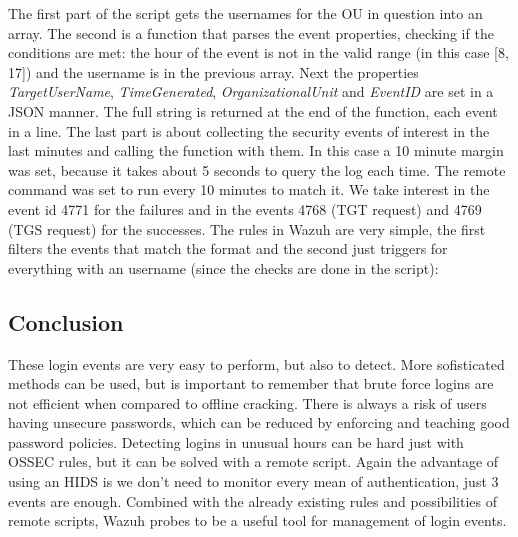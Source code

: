 \linej

\linej
The first part of the script gets the usernames for the OU in question into an array.
\linej
The second is a function that parses the event properties, checking if the conditions are met: the hour of the event is not in the valid range (in this case [8, 17]) and the username is in the previous array.
Next the properties \textit{TargetUserName}, \textit{TimeGenerated}, \textit{OrganizationalUnit} and \textit{EventID} are set in a JSON manner.
The full string is returned at the end of the function, each event in a line.
\linej
The last part is about collecting the security events of interest in the last minutes and calling the function with them. In this case a 10 minute margin was set, because it takes about 5 seconds to query the log each time. The remote command was set to run every 10 minutes to match it.
\linej
We take interest in the event id 4771 for the failures and in the events 4768 (TGT request) and 4769 (TGS request) for the successes\cite{windows_events}.
\linej
\linej
The rules in Wazuh are very simple, the first filters the events that match the format and the second just triggers for everything with an username (since the checks are done in the script):


\subsection{Conclusion}
These login events are very easy to perform, but also to detect.
More sofisticated methods can be used, but is important to remember that brute force logins are not efficient when compared to offline cracking.
There is always a risk of users having unsecure passwords, which can be reduced by enforcing and teaching good password policies.
\linej
Detecting logins in unusual hours can be hard just with OSSEC rules, but it can be solved with a remote script.
\linej
\linej
Again the advantage of using an HIDS is we don't need to monitor every mean of authentication, just 3 events are enough. Combined with the already existing rules and possibilities of remote scripts, Wazuh probes to be a useful tool for management of login events.
